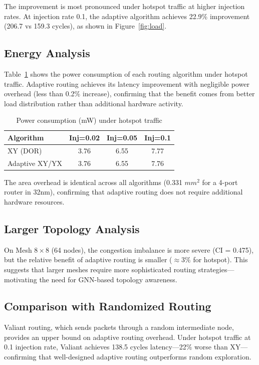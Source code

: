 The improvement is most pronounced under hotspot traffic at higher injection rates. At injection rate 0.1, the adaptive algorithm achieves 22.9\% improvement (206.7 vs 159.3 cycles), as shown in Figure~\ref{fig:load}.

\subsection{Energy Analysis}

Table~\ref{tab:energy} shows the power consumption of each routing algorithm under hotspot traffic. Adaptive routing achieves its latency improvement with negligible power overhead (less than 0.2\% increase), confirming that the benefit comes from better load distribution rather than additional hardware activity.

\begin{table}[h]
\centering
\caption{Power consumption (mW) under hotspot traffic}
\label{tab:energy}
\begin{tabular}{lccc}
\toprule
\textbf{Algorithm} & \textbf{Inj=0.02} & \textbf{Inj=0.05} & \textbf{Inj=0.1} \\
\midrule
XY (DOR) & 3.76 & 6.55 & 7.77 \\
Adaptive XY/YX & 3.76 & 6.55 & 7.76 \\
\bottomrule
\end{tabular}
\end{table}

The area overhead is identical across all algorithms (0.331 $mm^2$ for a 4-port router in 32nm), confirming that adaptive routing does not require additional hardware resources.

\subsection{Larger Topology Analysis}

On Mesh $8\times8$ (64 nodes), the congestion imbalance is more severe (CI = 0.475), but the relative benefit of adaptive routing is smaller ($\approx 3\%$ for hotspot). This suggests that larger meshes require more sophisticated routing strategies---motivating the need for GNN-based topology awareness.

\subsection{Comparison with Randomized Routing}

Valiant routing, which sends packets through a random intermediate node, provides an upper bound on adaptive routing overhead. Under hotspot traffic at 0.1 injection rate, Valiant achieves 138.5 cycles latency---22\% worse than XY---confirming that well-designed adaptive routing outperforms random exploration.

